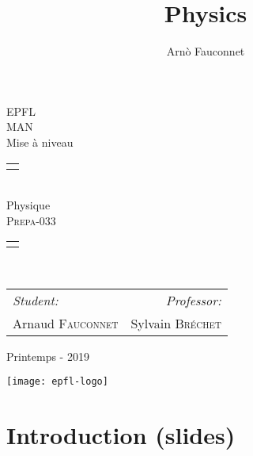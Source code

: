 \documentclass[
    11pt,
    a4paper,
    oneside,
    headinlcude, footinclude,
    twoside,
]{report}
\title{Physics}
\author{Arnò Fauconnet}
\begin{document}
\begin{titlepage}
   \begin{center}
       \vspace*{\fill}

       {\Huge EPFL}\\ 
       \vfill
       {\huge MAN}\\ [1em]
       {\Large Mise à niveau}\\
        \vfill
        \begin{tabularx}{\textwidth}{X}
            \Xhline{3\arrayrulewidth}\\
        \end{tabularx}\\ [2em]
        {\Huge Physique} \\ [1em]
        \textsc{\huge Prepa-033} \\ [2em]
        \begin{tabularx}{\textwidth}{X}
            \Xhline{3\arrayrulewidth}\\
        \end{tabularx}\\ [2em]
        \vspace{.7cm}
        {\large
        \begin{tabularx}{.9\textwidth}{Xr}
            \textit{Student:} & \textit{Professor:}\\
            Arnaud \textsc{Fauconnet} & Sylvain \textsc{Bréchet}
        \end{tabularx}}
        \vfill
        {\Large Printemps - 2019}

        \vfill
        \texttt{[image: epfl-logo]}

       \vfill
   \end{center} 
\end{titlepage} 
\setcounter{chapter}{0}
\chapter{Introduction (slides)}
\end{document}
